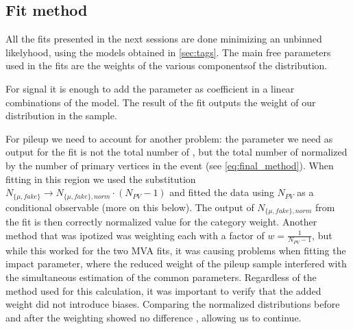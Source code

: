 \subsection{Fit method}
\label{subsec:fit_method}

All the fits presented in the next sessions are done minimizing an unbinned likelyhood, using the models obtained in \autoref{sec:tags}.
The main free parameters used in the fits are the weights of the various componentsof the distribution.

For signal \Pgm it is enough to add the parameter as coefficient in a linear combinations of the model.
The result of the fit outputs the weight of our distribution in the sample.

For pileup \Pgm we need to account for another problem: the parameter we need as output for the fit is not the total number of \Pgm, but the total number of \Pgm normalized by the number of primary vertices in the event (see \autoref{eq:final_method}).
When fitting in this region we used the substitution $N_{\{\mu,fake\}}\to N_{\{\mu,fake\}, norm}\cdot \left(N_{PV}-1\right)$ and fitted the data using $N_{PV}$ as a conditional observable (more on this below).
The output of $N_{\{\mu,fake\}, norm}$ from the fit is then correctly normalized value for the category weight.
Another method that was ipotized was weighting each \Pgm with a factor of $w=\frac{1}{N_{PV}-1}$, but while this worked for the two MVA fits, it was causing problems when fitting the impact parameter, where the reduced weight of the pileup sample interfered with the simultaneous estimation of the common parameters.
Regardless of the method used for this calculation, it was important to verify that the added weight did not introduce biases.
Comparing the normalized distributions before and after the weighting showed no difference , allowing us to continue.

